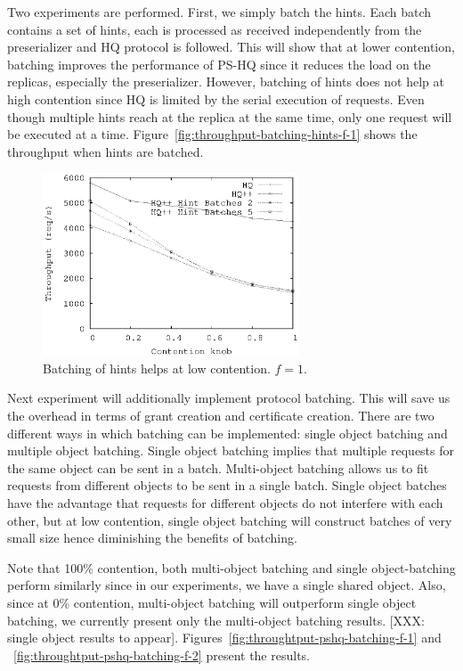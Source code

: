 \documentclass[twocolumn,10pt]{article}
\begin{document}
Two experiments are performed. First, we simply batch the hints. Each batch contains a set of hints,
each is processed as received independently from the preserializer and HQ protocol is followed. This
will show that at lower contention, batching improves the performance of PS-HQ since it reduces the
load on the replicas, especially the preserializer. However, batching of hints does not help at
high contention since HQ is limited by the serial execution of requests. Even though multiple hints
reach at the replica at the same time, only one request will be executed at a time. 
Figure~\ref{fig:throughput-batching-hints-f-1} shows the throughput when hints are batched. 

\begin{figure}
\centering
\includegraphics[width=3.0in]{temp-Figures/hint-batching-throughput-f-1.ps}
\caption{Batching of hints helps at low contention. $f=1$.}
\label{fig:throughtput-batching-hints-f-1}
\end{figure}

Next experiment will additionally implement protocol batching. This will save us the overhead in 
terms of grant creation and certificate creation. There are two different ways in which batching
can be implemented: single object batching and multiple object batching. Single object batching implies
that multiple requests for the same object can be sent in a batch. Multi-object batching allows
us to fit requests from different objects to be sent in a single batch. Single object batches have
the advantage that requests for different objects do not interfere with each other, but at low 
contention, single object batching will construct batches of very small size hence diminishing the
benefits of batching. 

Note that 100\% contention, both multi-object batching and single object-batching perform similarly
since in our experiments, we have a single shared object. Also, since at 0\% contention, multi-object
batching will outperform single object batching, we currently present only the multi-object batching
results. [XXX: single object results to appear]. Figures~\ref{fig:throughtput-pshq-batching-f-1} 
and ~\ref{fig:throughtput-pshq-batching-f-2} present the results.
\end{document}
